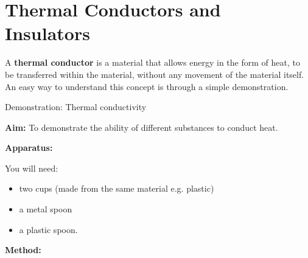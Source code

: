             \section{Thermal Conductors and Insulators}
            \nopagebreak
      \label{m38706*id66527}A \textbf{thermal conductor} is a material that allows energy in the form of heat, to be transferred within the material, without any movement of the material itself. An easy way to understand this concept is through a simple demonstration.\par 
\label{m38706*secfhsst!!!underscore!!!id453}
            \begin{g_experiment}{Demonstration: Thermal conductivity}{
            \nopagebreak
            \label{m38706*id66568}\noindent{}\textbf{Aim: }\newline
    To demonstrate the ability of different substances to conduct heat.\par 
      \label{m38706*id66588}\noindent{}\textbf{Apparatus: }\newline
\begin{minipage}{.5\textwidth}
You will need:
\begin{itemize}
 \item two cups (made from the same material e.g. plastic)
\item a metal spoon
\item a plastic spoon.
\end{itemize} 
\end{minipage}
\begin{minipage}{.5\textwidth}
	\begin{figure}[H] %
    \begin{center}
    \end{center}
 \end{figure} 
\end{minipage}
      \label{m38706*id66592}\textbf{Method:}
}
\end{g_experiment}
